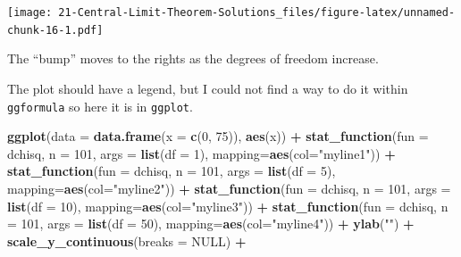 \documentclass[
]{book}
\newenvironment{Shaded}{\begin{snugshade}}{\end{snugshade}}
\newcommand{\DataTypeTok}[1]{\textcolor[rgb]{0.13,0.29,0.53}{#1}}
\newcommand{\DecValTok}[1]{\textcolor[rgb]{0.00,0.00,0.81}{#1}}
\newcommand{\KeywordTok}[1]{\textcolor[rgb]{0.13,0.29,0.53}{\textbf{#1}}}
\newcommand{\NormalTok}[1]{#1}
\newcommand{\OperatorTok}[1]{\textcolor[rgb]{0.81,0.36,0.00}{\textbf{#1}}}
\newcommand{\OtherTok}[1]{\textcolor[rgb]{0.56,0.35,0.01}{#1}}
\newcommand{\StringTok}[1]{\textcolor[rgb]{0.31,0.60,0.02}{#1}}
\begin{document}
\texttt{[image: 21-Central-Limit-Theorem-Solutions\_files/figure-latex/unnamed-chunk-16-1.pdf]}

The ``bump'' moves to the rights as the degrees of freedom increase.

The plot should have a legend, but I could not find a way to do it within \texttt{ggformula} so here it is in \texttt{ggplot}.

\begin{Shaded}
\begin{Highlighting}[]
\KeywordTok{ggplot}\NormalTok{(}\DataTypeTok{data =} \KeywordTok{data.frame}\NormalTok{(}\DataTypeTok{x =} \KeywordTok{c}\NormalTok{(}\DecValTok{0}\NormalTok{, }\DecValTok{75}\NormalTok{)), }\KeywordTok{aes}\NormalTok{(x)) }\OperatorTok{+}
\StringTok{  }\KeywordTok{stat_function}\NormalTok{(}\DataTypeTok{fun =}\NormalTok{ dchisq, }\DataTypeTok{n =} \DecValTok{101}\NormalTok{, }
                \DataTypeTok{args =} \KeywordTok{list}\NormalTok{(}\DataTypeTok{df =} \DecValTok{1}\NormalTok{),}
                \DataTypeTok{mapping=}\KeywordTok{aes}\NormalTok{(}\DataTypeTok{col=}\StringTok{"myline1"}\NormalTok{)) }\OperatorTok{+}\StringTok{ }
\StringTok{  }\KeywordTok{stat_function}\NormalTok{(}\DataTypeTok{fun =}\NormalTok{ dchisq, }\DataTypeTok{n =} \DecValTok{101}\NormalTok{, }
                \DataTypeTok{args =} \KeywordTok{list}\NormalTok{(}\DataTypeTok{df =} \DecValTok{5}\NormalTok{),}
                \DataTypeTok{mapping=}\KeywordTok{aes}\NormalTok{(}\DataTypeTok{col=}\StringTok{"myline2"}\NormalTok{)) }\OperatorTok{+}\StringTok{ }
\StringTok{  }\KeywordTok{stat_function}\NormalTok{(}\DataTypeTok{fun =}\NormalTok{ dchisq, }\DataTypeTok{n =} \DecValTok{101}\NormalTok{, }
                \DataTypeTok{args =} \KeywordTok{list}\NormalTok{(}\DataTypeTok{df =} \DecValTok{10}\NormalTok{),}
                \DataTypeTok{mapping=}\KeywordTok{aes}\NormalTok{(}\DataTypeTok{col=}\StringTok{"myline3"}\NormalTok{)) }\OperatorTok{+}\StringTok{    }
\StringTok{   }\KeywordTok{stat_function}\NormalTok{(}\DataTypeTok{fun =}\NormalTok{ dchisq, }\DataTypeTok{n =} \DecValTok{101}\NormalTok{, }
                \DataTypeTok{args =} \KeywordTok{list}\NormalTok{(}\DataTypeTok{df =} \DecValTok{50}\NormalTok{),}
                \DataTypeTok{mapping=}\KeywordTok{aes}\NormalTok{(}\DataTypeTok{col=}\StringTok{"myline4"}\NormalTok{)) }\OperatorTok{+}\StringTok{ }
\StringTok{   }\KeywordTok{ylab}\NormalTok{(}\StringTok{""}\NormalTok{) }\OperatorTok{+}
\StringTok{  }\KeywordTok{scale_y_continuous}\NormalTok{(}\DataTypeTok{breaks =} \OtherTok{NULL}\NormalTok{) }\OperatorTok{+}

\end{Highlighting}
\end{Shaded}
\end{document}
